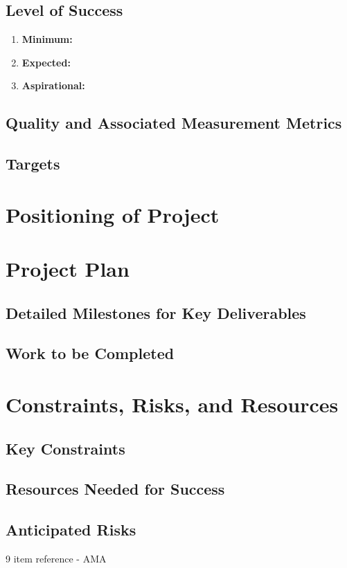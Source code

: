 \documentclass[12pt,a4paper]{article}
\begin{document}
\subsection{Level of Success}
\begin{enumerate}
    \item \textbf{Minimum: }
    
    \item \textbf{Expected: }
        
    \item \textbf{Aspirational: }

\end{enumerate}
\subsection{Quality and Associated Measurement Metrics}

\subsection{Targets}

\section{Positioning of Project}


\section{Project Plan}
\subsection{Detailed Milestones for Key Deliverables}


\subsection{Work to be Completed}


\section{Constraints, Risks, and Resources}
\subsection{Key Constraints}


\subsection{Resources Needed for Success}

\subsection{Anticipated Risks}

\pagebreak
\begin{thebibliography}{9}
item reference - AMA
\end{thebibliography}
\end{document}
